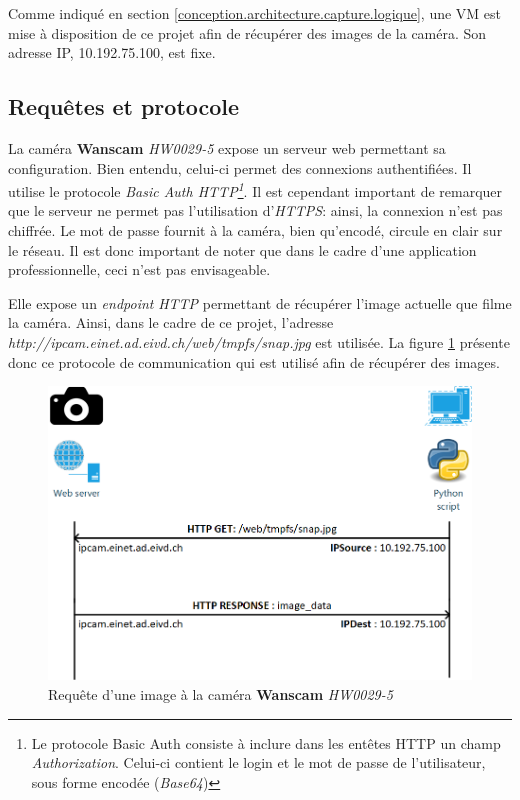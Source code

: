
Comme indiqué en section \ref{conception.architecture.capture.logique}, une VM est mise à disposition de ce projet afin de récupérer des images de la caméra. Son adresse IP, 10.192.75.100, est fixe.

\subsection{Requêtes et protocole}
La caméra \textbf{Wanscam} \textit{HW0029-5} expose un serveur web permettant sa configuration. Bien entendu, celui-ci permet des connexions authentifiées. Il utilise le protocole \textit{Basic Auth HTTP\footnote{Le protocole Basic Auth consiste à inclure dans les entêtes HTTP un champ \textit{Authorization}. Celui-ci contient le login et le mot de passe de l'utilisateur, sous forme encodée (\textit{Base64})}}\autocite{wiki:basic-auth}. Il est cependant important de remarquer que le serveur ne permet pas l'utilisation d'\textit{HTTPS}: ainsi, la connexion n'est pas chiffrée. Le mot de passe fournit à la caméra, bien qu'encodé, circule en clair sur le réseau. Il est  donc important de noter que dans le cadre d'une application professionnelle, ceci n'est pas envisageable.

Elle expose un \textit{endpoint} \textit{HTTP} permettant de récupérer l'image actuelle que filme la caméra. Ainsi, dans le cadre de ce projet, l'adresse \textit{http://ipcam.einet.ad.eivd.ch/web/tmpfs/snap.jpg} est utilisée. La figure \ref{fig:image_request} présente donc ce protocole de communication qui est utilisé afin de récupérer des images.

\begin{figure}[H]
    \includegraphics[width=130mm]{img/realisation/cam_request.png}
    \centering
    \caption{Requête d'une image à la caméra \textbf{Wanscam} \textit{HW0029-5}}
    \label{fig:image_request}
\end{figure} 

